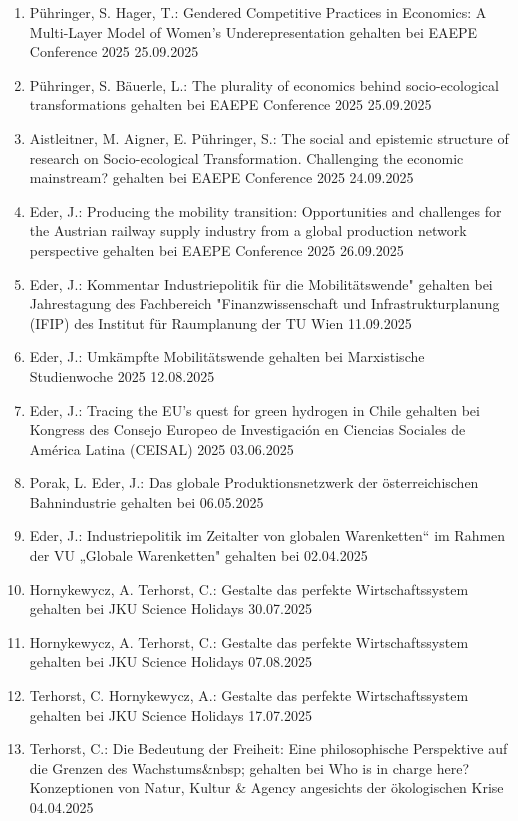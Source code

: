 \begin{enumerate}
	\item Pühringer, S. Hager, T.: Gendered Competitive Practices in Economics: A Multi-Layer Model of Women's Underepresentation gehalten bei EAEPE Conference 2025 25.09.2025
	\item Pühringer, S. Bäuerle, L.: The plurality of economics behind socio-ecological transformations gehalten bei EAEPE Conference 2025 25.09.2025
	\item Aistleitner, M. Aigner, E. Pühringer, S.: The social and epistemic structure of research on Socio-ecological Transformation. Challenging the economic mainstream? gehalten bei EAEPE Conference 2025 24.09.2025
	\item Eder, J.: Producing the mobility transition: Opportunities and challenges for the Austrian railway supply industry from a global production network perspective gehalten bei EAEPE Conference 2025 26.09.2025
	\item Eder, J.: Kommentar \glqq Industriepolitik für die Mobilitätswende" gehalten bei Jahrestagung des Fachbereich "Finanzwissenschaft und Infrastrukturplanung\grqq{} (IFIP) des Institut für Raumplanung der TU Wien 11.09.2025
	\item Eder, J.: Umkämpfte Mobilitätswende gehalten bei Marxistische Studienwoche 2025 12.08.2025
	\item Eder, J.: Tracing the EU’s quest for green hydrogen in Chile gehalten bei Kongress des Consejo Europeo de Investigación en Ciencias Sociales de América Latina (CEISAL) 2025 03.06.2025
	\item Porak, L. Eder, J.: Das globale Produktionsnetzwerk der österreichischen Bahnindustrie gehalten bei  06.05.2025
	\item Eder, J.: Industriepolitik im Zeitalter von globalen Warenketten“ im Rahmen der VU „Globale Warenketten" gehalten bei  02.04.2025
	\item Hornykewycz, A. Terhorst, C.: Gestalte das perfekte Wirtschaftssystem gehalten bei JKU Science Holidays 30.07.2025
	\item Hornykewycz, A. Terhorst, C.: Gestalte das perfekte Wirtschaftssystem gehalten bei JKU Science Holidays 07.08.2025
	\item Terhorst, C. Hornykewycz, A.: Gestalte das perfekte Wirtschaftssystem gehalten bei JKU Science Holidays 17.07.2025
	\item Terhorst, C.: Die Bedeutung der Freiheit: Eine philosophische Perspektive auf die Grenzen des Wachstums\&nbsp; gehalten bei Who is in charge here?Konzeptionen von Natur, Kultur \& Agency angesichts der ökologischen Krise 04.04.2025

\end{enumerate}
